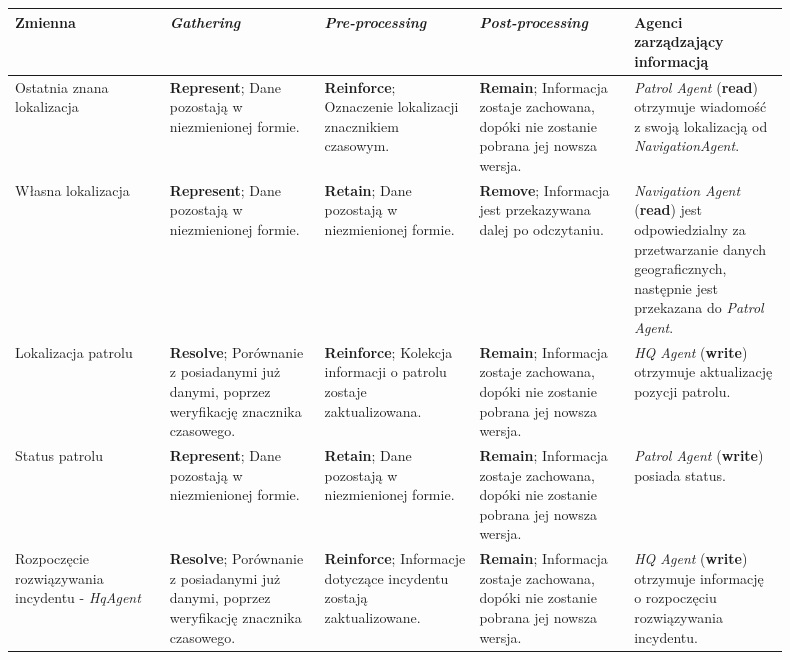 \begin{landscape}
    \begin{longtable}{|p{0.18\linewidth}|p{0.18\linewidth}|p{0.18\linewidth}|p{0.18\linewidth}|p{0.18\linewidth}|}
    \hline
    Zmienna & \emph{Gathering} & \emph{Pre-processing} & \emph{Post-processing} & Agenci zarządzający informacją \\
    \hline
    \hline

    Ostatnia znana lokalizacja & \textbf{Represent}; Dane pozostają w niezmienionej formie. & \textbf{Reinforce}; Oznaczenie lokalizacji znacznikiem czasowym. & \textbf{Remain}; Informacja zostaje zachowana, dopóki nie zostanie pobrana jej nowsza wersja.  & \emph{Patrol Agent} (\textbf{read}) otrzymuje wiadomość z swoją lokalizacją od \emph{NavigationAgent}. \\
     \hline
     
     Własna lokalizacja & \textbf{Represent}; Dane pozostają w niezmienionej formie. & \textbf{Retain}; Dane pozostają w niezmienionej formie. & \textbf{Remove}; Informacja jest przekazywana dalej po odczytaniu.  & \emph{Navigation Agent} (\textbf{read}) jest odpowiedzialny za przetwarzanie danych geograficznych, następnie jest przekazana do \emph{Patrol Agent}. \\
     \hline

     Lokalizacja patrolu & \textbf{Resolve}; Porównanie z posiadanymi już danymi, poprzez weryfikację znacznika czasowego. & \textbf{Reinforce}; Kolekcja informacji o patrolu zostaje zaktualizowana. & \textbf{Remain}; Informacja zostaje zachowana, dopóki nie zostanie pobrana jej nowsza wersja.  & \emph{HQ Agent} (\textbf{write}) otrzymuje aktualizację pozycji patrolu. \\
     \hline

     Status patrolu & \textbf{Represent}; Dane pozostają w niezmienionej formie. & \textbf{Retain}; Dane pozostają w niezmienionej formie. & \textbf{Remain}; Informacja zostaje zachowana, dopóki nie zostanie pobrana jej nowsza wersja.  & \emph{Patrol Agent} (\textbf{write}) posiada status. \\
     \hline

     Rozpoczęcie rozwiązywania incydentu - \emph{HqAgent} & \textbf{Resolve}; Porównanie z posiadanymi już danymi, poprzez weryfikację znacznika czasowego. & \textbf{Reinforce}; Informacje dotyczące incydentu zostają zaktualizowane. & \textbf{Remain}; Informacja zostaje zachowana, dopóki nie zostanie pobrana jej nowsza wersja.  & \emph{HQ Agent} (\textbf{write}) otrzymuje informację o rozpoczęciu rozwiązywania incydentu. \\
     \hline


\end{longtable}
\end{landscape}
